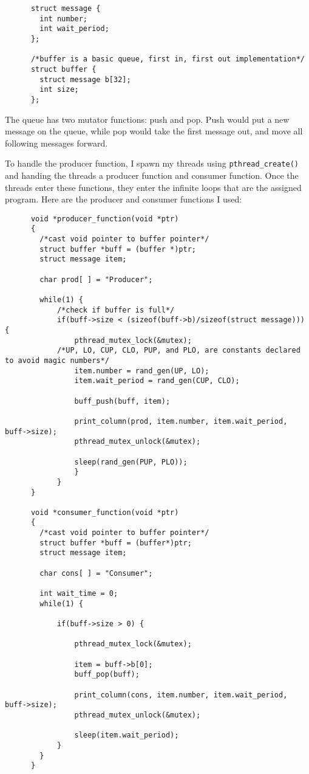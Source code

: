 \documentclass[10pt,letterpaper]{article}
\begin{document}
    \begin{lstlisting}
      struct message {
      	int number;
      	int wait_period;
      };

      /*buffer is a basic queue, first in, first out implementation*/
      struct buffer {
      	struct message b[32];
      	int size;
      };
    \end{lstlisting}

    \noindent The queue has two mutator functions: push and pop. Push would put
    a new message on the queue, while pop would take the first message out, and
    move all following messages forward.

    \noindent To handle the producer function, I spawn my threads using
    \texttt{pthread\_create()} and handing the threads a producer function and consumer
    function. Once the threads enter these functions, they enter the infinite
    loops that are the assigned program. Here are the producer and consumer
    functions I used:

    \begin{lstlisting}
      void *producer_function(void *ptr)
      {
      	/*cast void pointer to buffer pointer*/
      	struct buffer *buff = (buffer *)ptr;
      	struct message item;

      	char prod[ ] = "Producer";

      	while(1) {
      		/*check if buffer is full*/
      		if(buff->size < (sizeof(buff->b)/sizeof(struct message))) {
      			pthread_mutex_lock(&mutex);
            /*UP, LO, CUP, CLO, PUP, and PLO, are constants declared to avoid magic numbers*/
      			item.number = rand_gen(UP, LO);
      			item.wait_period = rand_gen(CUP, CLO);

      			buff_push(buff, item);

      			print_column(prod, item.number, item.wait_period, buff->size);
      			pthread_mutex_unlock(&mutex);

      			sleep(rand_gen(PUP, PLO));
      			}
      		}
      }

      void *consumer_function(void *ptr)
      {
      	/*cast void pointer to buffer pointer*/
      	struct buffer *buff = (buffer*)ptr;
      	struct message item;

      	char cons[ ] = "Consumer";

      	int wait_time = 0;
      	while(1) {

      		if(buff->size > 0) {

      			pthread_mutex_lock(&mutex);

      			item = buff->b[0];
      			buff_pop(buff);

      			print_column(cons, item.number, item.wait_period, buff->size);
      			pthread_mutex_unlock(&mutex);

      			sleep(item.wait_period);
      		}
      	}
      }
    \end{lstlisting}
\end{document}

